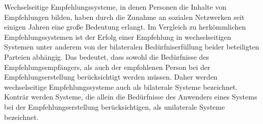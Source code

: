 Wechselseitige Empfehlungssysteme, in denen Personen die Inhalte von Empfehlungen bilden, haben durch die Zunahme an sozialen Netzwerken seit einigen Jahren eine große Bedeutung erlangt.
Im Vergleich zu herkömmlichen Empfehlungssystemen ist der Erfolg einer Empfehlung in wechselseitigen Systemen unter anderem von der bilateralen Bedürfniserfüllung beider beteiligten Parteien abhängig.
Das bedeutet, dass sowohl die Bedürfnisse des Empfehlungsempfängers, als auch der empfohlenen Person bei der Empfehlungserstellung berücksichtigt werden müssen.
Daher werden wechselseitige Empfehlungssysteme auch als bilaterale Systeme bezeichnet.
Konträr werden Systeme, die allein die Bedürfnisse des Anwenders eines Systems bei der Empfehlungserstellung berücksichtigen, als unilaterale Systeme bezeichnet.


